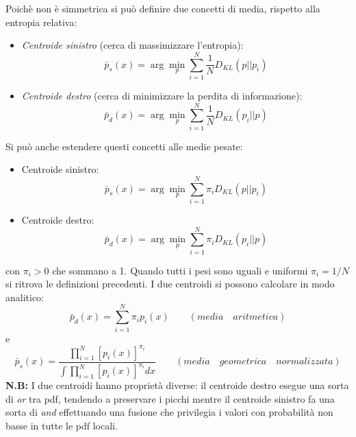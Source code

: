 Poich\`e non \`e simmetrica si pu\`o definire due concetti di media, rispetto alla entropia relativa:
\begin{itemize}
\item \textit{Centroide sinistro} (cerca di massimizzare l'entropia): \begin{equation}
\bar{p}_s(x) = \arg \min_{p} \sum_{i=1}^N \frac{1}{N} D_{KL}(p || p_i) 
    \end{equation}
\item \textit{Centroide destro} (cerca di minimizzare la perdita di informazione): \begin{equation}
    \bar{p}_d(x) = \arg \min_{p} \sum_{i=1}^N \frac{1}{N} D_{KL}(p_i || p)
    \end{equation}
\end{itemize}
Si pu\`o anche estendere questi concetti alle medie pesate:
\begin{itemize}
\item Centroide sinistro: \begin{equation}
\bar{p}_s(x) = \arg \min_{p} \sum_{i=1}^N \pi_{i} D_{KL}(p || p_i) 
    \end{equation}
\item Centroide destro: \begin{equation}
    \bar{p}_d(x) = \arg \min_{p} \sum_{i=1}^N \pi_{i} D_{KL}(p_i || p)
    \end{equation}
\end{itemize}
con $\pi_i > 0$ che sommano a 1. Quando tutti i pesi sono uguali e uniformi $\pi_i = 1/N$ si ritrova le definizioni precedenti.
I due centroidi si possono calcolare in modo analitico:
\begin{equation}
\bar{p}_d (x) = \sum_{i=1}^N \pi_i p_i(x) \qquad (media \quad aritmetica)
\end{equation} e \begin{equation}
\bar{p}_s (x) = \frac{\prod_{i=1}^N [p_i(x)]^{\pi_i}}{\int \prod_{i=1}^N [p_i(x)]^{\pi_i} dx } \qquad (media \quad geometrica \quad normalizzata)
\end{equation} 
\textbf{N.B:} I due centroidi hanno propriet\`a diverse: il centroide destro esegue una sorta di \textit{or} tra pdf, tendendo a preservare i picchi mentre il centroide sinistro fa una sorta di \textit{and} effettuando una fusione che privilegia i valori con probabilit\`a non basse in tutte le pdf locali.

